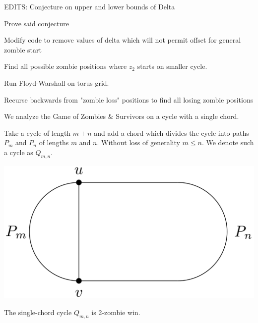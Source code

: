 EDITS: Conjecture on upper and lower bounds of Delta

Prove said conjecture

Modify code to remove values of delta which will not permit offset for general zombie start

Find all possible zombie positions where $z_2$ starts on smaller cycle.

Run Floyd-Warshall on torus grid.

Recurse backwards from "zombie loss" positions to find all losing zombie positions

We analyze the Game of Zombies \& Survivors on a cycle with a single chord.

\begin{definition}
 Take a cycle of length $m+n$ and add a chord which
 divides the cycle into paths $P_m$ and $P_n$ of lengths $m$ and $n$.
 Without loss of generality $m \leq n$. We denote such a cycle as $Q_{m,n}$.
\end{definition}

\begin{center}
 \includegraphics[scale=0.20]{q_m_n/Q_m_n_basic}
\end{center}

\begin{theorem}
 The single-chord cycle $Q_{m,n}$ is 2-zombie win.
\end{theorem}

